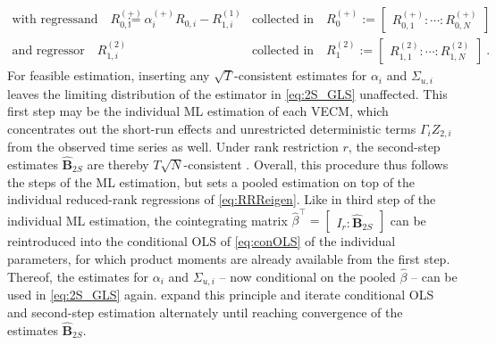 \begin{align}
	\text{with regressand} \quad R^{(+)}_{0,i} & := \alpha_{i}^{(+)} R^{\ }_{0,i} - R_{1,i}^{(1)} & \text{collected in} \quad R_0^{(+)} := \begin{bmatrix} R^{(+)}_{0,1} : \cdots : R^{(+)}_{0,N} \end{bmatrix} & \nonumber \\
	\text{and regressor} \quad R_{1,i}^{(2)} &  & \text{collected in} \quad R_1^{(2)} := \begin{bmatrix} R_{1,1}^{(2)} : \cdots : R_{1,N}^{(2)} \end{bmatrix} &. \nonumber
\end{align}
For feasible estimation, inserting any $ \sqrt{T} $-consistent estimates for $ \alpha_i $ and $ \Sigma_{u,i} $ leaves the limiting distribution of the estimator in \eqref{eq:2S_GLS} unaffected. This first step may be the individual ML estimation of each VECM, which concentrates out the short-run effects and unrestricted deterministic terms $ \Gamma_i Z_{2,i} $ from the observed time series as well. Under rank restriction $ r $, the second-step estimates $ \widehat{\mathbf{B}}_{2S}$ are thereby $ T\sqrt{N} $-consistent \citep[p.~156, Th.~1]{Breitung2005}. Overall, this procedure thus follows the steps of the ML estimation, but sets a pooled estimation on top of the individual reduced-rank regressions of \eqref{eq:RRReigen}. Like in third step of the individual ML estimation, the cointegrating matrix $ \widehat{\beta}^\top = \begin{bmatrix} I_r : \widehat{\mathbf{B}}_{2S} \end{bmatrix} $ can be reintroduced into the conditional OLS of \eqref{eq:conOLS} of the individual parameters, for which product moments are already available from the first step. Thereof, the estimates for $ \alpha_i $ and $ \Sigma_{u,i} $ -- now conditional on the pooled $ \widehat{\beta} $ -- can be used in \eqref{eq:2S_GLS} again. \citet[p.~195]{HlouskovaWagner2010} expand this principle and iterate conditional OLS and second-step estimation alternately until reaching convergence of the estimates $ \widehat{\mathbf{B}}_{2S} $.


